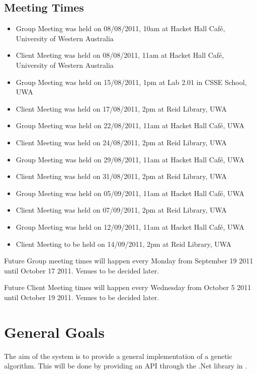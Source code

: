 \subsection*{Meeting Times}
\begin{itemize}
\item Group Meeting was held on 08/08/2011, 10am at Hacket Hall Caf\'e, University of Western Australia
\item Client Meeting was held on 08/08/2011, 11am at Hacket Hall Caf\'e, University of Western Australia
\item Group Meeting was held on 15/08/2011, 1pm at Lab 2.01 in CSSE School, UWA
\item Client Meeting was held on 17/08/2011, 2pm at Reid Library, UWA
\item Group Meeting was held on 22/08/2011, 11am at Hacket Hall Caf\'e, UWA
\item Client Meeting was held on 24/08/2011, 2pm at Reid Library, UWA
\item Group Meeting was held on 29/08/2011, 11am at Hacket Hall Caf\'e, UWA
\item Client Meeting was held on 31/08/2011, 2pm at Reid Library, UWA
\item Group Meeting was held on 05/09/2011, 11am at Hacket Hall Caf\'e, UWA
\item Client Meeting was held on 07/09/2011, 2pm at Reid Library, UWA
\item Group Meeting was held on 12/09/2011, 11am at Hacket Hall Caf\'e, UWA
\item Client Meeting to be held on 14/09/2011, 2pm at Reid Library, UWA
\end{itemize}

Future Group meeting times will happen every Monday from September 19 2011 until October 17 2011. Venues to be decided later.

Future Client Meeting times will happen every Wednesday from October 5 2011 until October 19 2011. Venues to be decided later. 

\clearpage

\tableofcontents

\clearpage


%
%
\section{General Goals}
The aim of the system is to provide a general implementation of a genetic algorithm. 
This will be done by providing an API through the .Net library in \csharp. 


